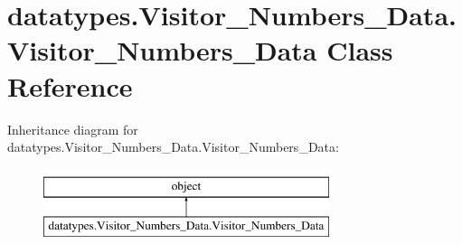 \hypertarget{classdatatypes_1_1Visitor__Numbers__Data_1_1Visitor__Numbers__Data}{}\section{datatypes.\+Visitor\+\_\+\+Numbers\+\_\+\+Data.\+Visitor\+\_\+\+Numbers\+\_\+\+Data Class Reference}
\label{classdatatypes_1_1Visitor__Numbers__Data_1_1Visitor__Numbers__Data}
Inheritance diagram for datatypes.\+Visitor\+\_\+\+Numbers\+\_\+\+Data.\+Visitor\+\_\+\+Numbers\+\_\+\+Data\+:\begin{figure}[H]
\begin{center}
\leavevmode
\includegraphics[height=2.000000cm]{classdatatypes_1_1Visitor__Numbers__Data_1_1Visitor__Numbers__Data}
\end{center}
\end{figure}
